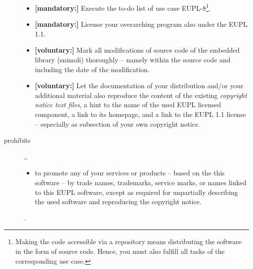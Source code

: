 \begin{description}
\begin{itemize}
  \item \textbf{[mandatory:]} Execute the to-do list of use case EUPL-8\footnote{
  Making the code accessible via a repository means distributing the software in
  the form of source code. Hence, you must also fulfill all tasks of the
  corresponding use case.}.
  
  \item \textbf{[mandatory:]} License your overarching program also under the
  EUPL 1.1.
  
  \item \textbf{[voluntary:]} Mark all modifications of source code of the
  embedded library (snimoli) thoroughly -- namely within the source code and
  including the date of the modification.

  \item \textbf{[voluntary:]} Let the documentation of your distribution and/or
  your additional material  also reproduce the content of the existing
  \emph{copyright notice text files}, a hint to the name of the used EUPL
  licensed component, a link to its homepage, and a link to the EUPL 1.1 license
  -- especially as subsection of your own copyright notice.
  
\end{itemize}

\item[prohibits] \ldots
\begin{itemize}
  \item to promote any of your services or products -- based on the this software
  -- by trade names, trademarks, service marks, or names linked to this EUPL
  software, except as required for unpartially describing the used software and
  reproducing the copyright notice.
\end{itemize}.

\end{description}

